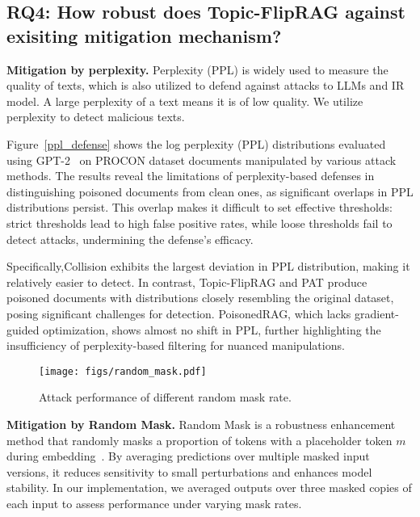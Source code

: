 \subsection{RQ4: How robust does Topic-FlipRAG against exisiting mitigation mechanism?}
\textbf{Mitigation by perplexity.}
Perplexity (PPL) is widely used to measure the quality of texts, which is also utilized to defend against attacks to LLMs and IR model\cite{jain2023baseline,gonen2022demystifying,liu2022order}. A large perplexity of a text means it is of low quality. We utilize perplexity to detect malicious texts.

Figure~\ref{ppl_defense} shows the log perplexity (PPL) distributions evaluated using GPT-2~\cite{radford2019language} on PROCON dataset documents manipulated by various attack methods. The results reveal the limitations of perplexity-based defenses in distinguishing poisoned documents from clean ones, as significant overlaps in PPL distributions persist. This overlap makes it difficult to set effective thresholds: strict thresholds lead to high false positive rates, while loose thresholds fail to detect attacks, undermining the defense's efficacy.

Specifically,Collision exhibits the largest deviation in PPL distribution, making it relatively easier to detect. In contrast, Topic-FlipRAG and PAT produce poisoned documents with distributions closely resembling the original dataset, posing significant challenges for detection. PoisonedRAG, which lacks gradient-guided optimization, shows almost no shift in PPL, further highlighting the insufficiency of perplexity-based filtering for nuanced manipulations.

\begin{figure}[!t]
  \centering
  \texttt{[image: figs/random\_mask.pdf]}
  \caption{Attack performance of different random mask rate.}
  \label{random_mask}
\end{figure}



\textbf{Mitigation by Random Mask.} Random Mask is a robustness enhancement method that randomly masks a proportion of tokens with a placeholder token $m$ during embedding~\cite{zeng2023certified}. By averaging predictions over multiple masked input versions, it reduces sensitivity to small perturbations and enhances model stability. In our implementation, we averaged outputs over three masked copies of each input to assess performance under varying mask rates.




